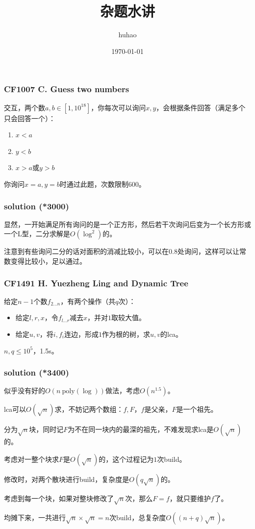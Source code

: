\documentclass[10pt]{beamer}
\begin{document}
	\title{杂题水讲}
	\date{\today}
	\author{huhao}
	\maketitle
	\clearpage
	\begin{frame}
		\frametitle{CF1007 C. Guess two numbers}
		交互，两个数$a,b\in[1,10^{18}]$，你每次可以询问$x,y$，会根据条件回答（满足多个只会回答一个）：
		\begin{enumerate}
			\item $x<a$
			\item $y<b$
			\item $x>a$或$y>b$
		\end{enumerate}
		你询问$x=a,y=b$时通过此题，次数限制$600$。
	\end{frame}
	\clearpage
	\begin{frame}
		\frametitle{solution (*3000)}
	
		显然，一开始满足所有询问的是一个正方形，然后若干次询问后变为一个长方形或一个L型，二分求解是$O(\log^2)$的。

		注意到有些询问二分的话对面积的消减比较小，可以在$0.8$处询问，这样可以让常数变得比较小，足以通过。
	
	\end{frame}
	\clearpage
	\begin{frame}
		\frametitle{CF1491 H. Yuezheng Ling and Dynamic Tree}
		给定$n-1$个数$f_{2\dots n}$，有两个操作（共$q$次）：
		\begin{itemize}
			\item 给定$l,r,x$，令$f_{l\dots r}$减去$x$，并对$1$取较大值。
			\item 给定$u,v$，将$i,f_i$连边，形成$1$作为根的树，求$u,v$的lca。
		\end{itemize}
		$n,q\le 10^5$，1.5s。
	\end{frame}
	\clearpage
	\begin{frame}
		\frametitle{solution (*3400)}
	
		似乎没有好的$O(n~\mathrm{poly}(\log))$做法，考虑$O(n^{1.5})$。

		lca可以$O(\sqrt n)$求，不妨记两个数组：$f,F$，$f$是父亲，$F$是一个祖先。

		分为$\sqrt n$块，同时记$F$为不在同一块内的最深的祖先，不难发现求lca是$O(\sqrt n)$的。

		考虑对一整个块求$F$是$O(\sqrt n)$的，这个过程记为$1$次build。

		修改时，对两个散块进行build，复杂度是$O(q\sqrt n)$的。

		考虑到每一个块，如果对整块修改了$\sqrt n$次，那么$F=f$，就只要维护$f$了。

		均摊下来，一共进行$\sqrt n\times \sqrt n=n$次build，总复杂度$O((n+q)\sqrt n)$。
	
	\end{frame}
\end{document}
